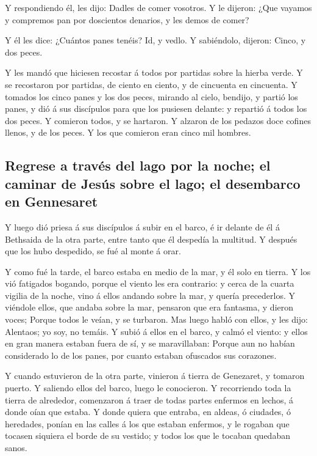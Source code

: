  Y respondiendo él, les dijo: Dadles de comer vosotros. Y
le dijeron: ¿Que vayamos y compremos pan por doscientos denarios, y les
demos de comer?

 Y él les dice: ¿Cuántos panes tenéis? Id, y vedlo. Y
sabiéndolo, dijeron: Cinco, y dos peces.

 Y les mandó que hiciesen recostar á todos por partidas
sobre la hierba verde.  Y se recostaron por partidas, de
ciento en ciento, y de cincuenta en cincuenta.  Y tomados
los cinco panes y los dos peces, mirando al cielo, bendijo, y partió los
panes, y dió á sus discípulos para que los pusiesen delante: y repartió
á todos los dos peces.  Y comieron todos, y se hartaron.
 Y alzaron de los pedazos doce cofines llenos, y de los
peces.  Y los que comieron eran cinco mil hombres.

\hypertarget{regrese-a-travuxe9s-del-lago-por-la-noche-el-caminar-de-jesuxfas-sobre-el-lago-el-desembarco-en-gennesaret}{%
\subsection{Regrese a través del lago por la noche; el caminar de Jesús
sobre el lago; el desembarco en
Gennesaret}\label{regrese-a-travuxe9s-del-lago-por-la-noche-el-caminar-de-jesuxfas-sobre-el-lago-el-desembarco-en-gennesaret}}

 Y luego dió priesa á sus discípulos á subir en el barco,
é ir delante de él á Bethsaida de la otra parte, entre tanto que él
despedía la multitud.  Y después que los hubo despedido,
se fué al monte á orar.

 Y como fué la tarde, el barco estaba en medio de la mar,
y él solo en tierra.  Y los vió fatigados bogando, porque
el viento les era contrario: y cerca de la cuarta vigilia de la noche,
vino á ellos andando sobre la mar, y quería precederlos. 
Y viéndole ellos, que andaba sobre la mar, pensaron que era fantasma, y
dieron voces;  Porque todos le veían, y se turbaron. Mas
luego habló con ellos, y les dijo: Alentaos; yo soy, no temáis.
 Y subió á ellos en el barco, y calmó el viento: y ellos
en gran manera estaban fuera de sí, y se maravillaban: 
Porque aun no habían considerado lo de los panes, por cuanto estaban
ofuscados sus corazones.

 Y cuando estuvieron de la otra parte, vinieron á tierra
de Genezaret, y tomaron puerto.  Y saliendo ellos del
barco, luego le conocieron.  Y recorriendo toda la tierra
de alrededor, comenzaron á traer de todas partes enfermos en lechos, á
donde oían que estaba.  Y donde quiera que entraba, en
aldeas, ó ciudades, ó heredades, ponían en las calles á los que estaban
enfermos, y le rogaban que tocasen siquiera el borde de su vestido; y
todos los que le tocaban quedaban sanos.

